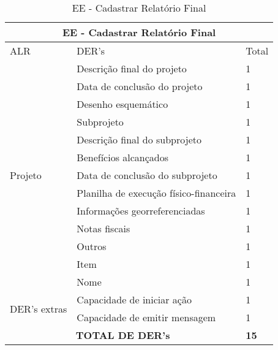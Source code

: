 \begin{table}[!h]
\centering
\caption{EE - Cadastrar Relatório Final}
\label{ee_cadastrar_relatório_final}
\begin{tabular}{|l|l|l|}
\hline
\multicolumn{3}{|c|}{EE - Cadastrar Relatório Final}                                                                 \\ \hline
ALR                           & DER's                                                & Total              \\ \hline
\multirow{13}{*}{Projeto}     & Descrição final do projeto             & 1 \\ \cline{2-3}
                             & Data de conclusão do projeto           & 1 \\ \cline{2-3}
                             & Desenho esquemático                    & 1 \\ \cline{2-3} 
			      & Subprojeto                             & 1 \\ \cline{2-3}
                             & Descrição final do subprojeto          & 1 \\ \cline{2-3}
                             & Benefícios alcançados                  & 1 \\ \cline{2-3}
                             & Data de conclusão do subprojeto        & 1 \\ \cline{2-3}
                             & Planilha de execução físico-financeira & 1 \\ \cline{2-3}
                             & Informações georreferenciadas          & 1 \\ \cline{2-3}
                             & Notas fiscais                          & 1 \\ \cline{2-3}
                             & Outros                                 & 1 \\ \cline{2-3}
                             & Item                                   & 1 \\ \cline{2-3}
                             & Nome                                   & 1 \\ \cline{2-3} \hline
\multirow{2}{*}{DER's extras} & Capacidade de iniciar ação             & 1 \\ \cline{2-3}
                 & Capacidade de emitir mensagem& 1 \\ \hline

\multicolumn{2}{|c|}{\textbf{TOTAL DE DER's}}                                                 & \textbf{15}                 \\ \hline
\end{tabular}
\end{table}


